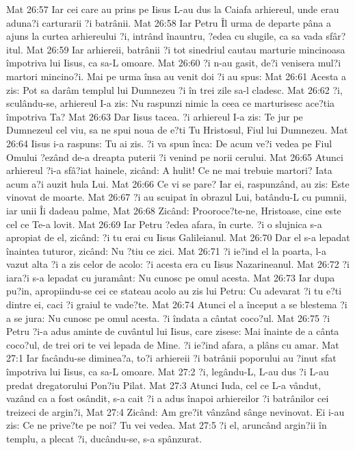 Mat 26:57  Iar cei care au prins pe Iisus L-au dus la Caiafa arhiereul, unde erau aduna?i carturarii ?i batrânii.
Mat 26:58  Iar Petru Îl urma de departe pâna a ajuns la curtea arhiereului ?i, intrând înauntru, ?edea cu slugile, ca sa vada sfâr?itul.
Mat 26:59  Iar arhiereii, batrânii ?i tot sinedriul cautau marturie mincinoasa împotriva lui Iisus, ca sa-L omoare.
Mat 26:60  ?i n-au gasit, de?i venisera mul?i martori mincino?i. Mai pe urma însa au venit doi ?i au spus:
Mat 26:61  Acesta a zis: Pot sa darâm templul lui Dumnezeu ?i în trei zile sa-l cladesc.
Mat 26:62  ?i, sculându-se, arhiereul I-a zis: Nu raspunzi nimic la ceea ce marturisesc ace?tia împotriva Ta?
Mat 26:63  Dar Iisus tacea. ?i arhiereul I-a zis: Te jur pe Dumnezeul cel viu, sa ne spui noua de e?ti Tu Hristosul, Fiul lui Dumnezeu.
Mat 26:64  Iisus i-a raspuns: Tu ai zis. ?i va spun înca: De acum ve?i vedea pe Fiul Omului ?ezând de-a dreapta puterii ?i venind pe norii cerului.
Mat 26:65  Atunci arhiereul ?i-a sfâ?iat hainele, zicând: A hulit! Ce ne mai trebuie martori? Iata acum a?i auzit hula Lui.
Mat 26:66  Ce vi se pare? Iar ei, raspunzând, au zis: Este vinovat de moarte.
Mat 26:67  ?i au scuipat în obrazul Lui, batându-L cu pumnii, iar unii Îi dadeau palme,
Mat 26:68  Zicând: Prooroce?te-ne, Hristoase, cine este cel ce Te-a lovit.
Mat 26:69  Iar Petru ?edea afara, în curte. ?i o slujnica s-a apropiat de el, zicând: ?i tu erai cu Iisus Galileianul.
Mat 26:70  Dar el s-a lepadat înaintea tuturor, zicând: Nu ?tiu ce zici.
Mat 26:71  ?i ie?ind el la poarta, l-a vazut alta ?i a zis celor de acolo: ?i acesta era cu Iisus Nazarineanul.
Mat 26:72  ?i iara?i s-a lepadat cu juramânt: Nu cunosc pe omul acesta.
Mat 26:73  Iar dupa pu?in, apropiindu-se cei ce stateau acolo au zis lui Petru: Cu adevarat ?i tu e?ti dintre ei, caci ?i graiul te vade?te.
Mat 26:74  Atunci el a început a se blestema ?i a se jura: Nu cunosc pe omul acesta. ?i îndata a cântat coco?ul.
Mat 26:75  ?i Petru ?i-a adus aminte de cuvântul lui Iisus, care zisese: Mai înainte de a cânta coco?ul, de trei ori te vei lepada de Mine. ?i ie?ind afara, a plâns cu amar.
Mat 27:1  Iar facându-se diminea?a, to?i arhiereii ?i batrânii poporului au ?inut sfat împotriva lui Iisus, ca sa-L omoare.
Mat 27:2  ?i, legându-L, L-au dus ?i L-au predat dregatorului Pon?iu Pilat.
Mat 27:3  Atunci Iuda, cel ce L-a vândut, vazând ca a fost osândit, s-a cait ?i a adus înapoi arhiereilor ?i batrânilor cei treizeci de argin?i,
Mat 27:4  Zicând: Am gre?it vânzând sânge nevinovat. Ei i-au zis: Ce ne prive?te pe noi? Tu vei vedea.
Mat 27:5  ?i el, aruncând argin?ii în templu, a plecat ?i, ducându-se, s-a spânzurat.
